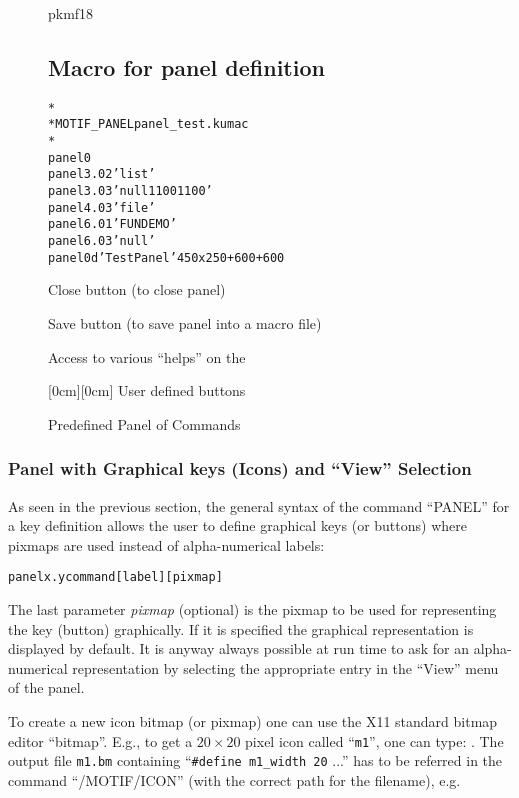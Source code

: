 \begin{figure}
\begin{PICTf}[.45]{pkmf18}
\subsection*{Macro for panel definition}
\begin{alltt}
*
* MOTIF_PANEL panel_test.kumac
*
panel 0
panel 3.02 'list'
panel 3.03 'null 1 100 1 100'
panel 4.03 'file'
panel 6.01 'FUNDEMO'
panel 6.03 'null'
panel 0 d 'Test Panel' 450x250+600+600
\end{alltt}
\end{PICTf}
\begin{EnumZB}
\item Close button (to close panel)
\item Save button (to save panel into a macro file)
\item Access to various ``helps''  on the \PNI{}
\end{EnumZB}
\begin{EnumZW}
\item \raisebox{-2pt}[0cm][0cm]{\Large{} }
User defined buttons
\end{EnumZW}
\caption{Predefined Panel of Commands}
\label{ref:FIGPKMF18}
\end{figure}
 
\subsubsection{Panel with Graphical keys (Icons) and ``View'' Selection}
\label{ref:repaview}
 
As seen in the previous section,
the general syntax of the command ``PANEL''
for a key definition allows the user to define
graphical keys (or buttons) where pixmaps are used instead of
alpha-numerical labels:
 
\begin{alltt}
 panel x.y command [label] [pixmap]
\end{alltt}
 
The last parameter {\it pixmap} (optional) is the pixmap to be used for
representing the key (button) graphically. If it is specified the
graphical representation is displayed by default. It is anyway
always possible at run time to ask for an alpha-numerical
representation by selecting the appropriate entry in the ``View''
menu of the panel.
 
To create a new icon bitmap (or pixmap) one can use the X11 standard bitmap
editor ``bitmap''. E.g., to get a \(20\times20\) pixel icon called
``\texttt{m1}'', one can type: .
The output file \texttt{m1.bm} containing ``\texttt{\#define m1\_width 20} ...''
has to be referred in the command ``/MOTIF/ICON'' (with the correct
path for the filename), e.g.\ 
 
